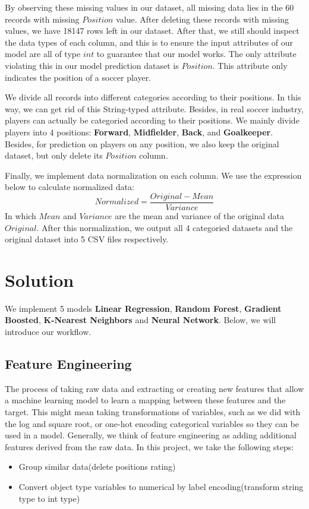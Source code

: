 \documentclass{article}
\begin{document}
\par By observing these missing values in our dataset, all missing data lies in the 60 records with missing $Position$ value. After deleting these records with missing values, we have 18147 rows left in our dataset. After that, we still should inspect the data types of each column, and this is to ensure the input attributes of our model are all of type $int$ to guarantee that our model works. The only attribute violating this in our model prediction dataset is $Position$. This attribute only indicates the position of a soccer player.
\par We divide all records into different categories according to their positions. In this way, we can get rid of this String-typed attribute. Besides, in real soccer industry, players can actually be categoried according to their positions. We mainly divide players into 4 positions: \textbf{Forward}, \textbf{Midfielder}, \textbf{Back}, and \textbf{Goalkeeper}. Besides, for prediction on players on any position, we also keep the original dataset, but only delete its $Position$ column.
\par Finally, we implement data normalization on each column. We use the expression below to calculate normalized data:
$$Normalized = \frac{Original-Mean}{Variance}$$
In which $Mean$ and $Variance$ are the mean and variance of the original data $Original$. After this normalization, we output all 4 categoried datasets and the original dataset into 5 CSV files respectively.

\section*{Solution}
We implement 5 models \textbf{Linear Regression}, \textbf{Random Forest}, \textbf{Gradient Boosted}, \textbf{K-Nearest Neighbors} and \textbf{Neural Network}. Below, we will introduce our workflow.

\subsection*{Feature Engineering}
The process of taking raw data and extracting or creating new features that allow a machine learning model to learn a mapping between these features and the target. This might mean taking transformations of variables, such as we did with the log and square root, or one-hot encoding categorical variables so they can be used in a model. Generally, we think of feature engineering as adding additional features derived from the raw data.
In this project, we take the following steps:
\begin{itemize}
    \item Group similar data(delete positions rating)
    \item Convert object type variables to numerical by label encoding(transform string type to int type)
\end{itemize}
\end{document}
